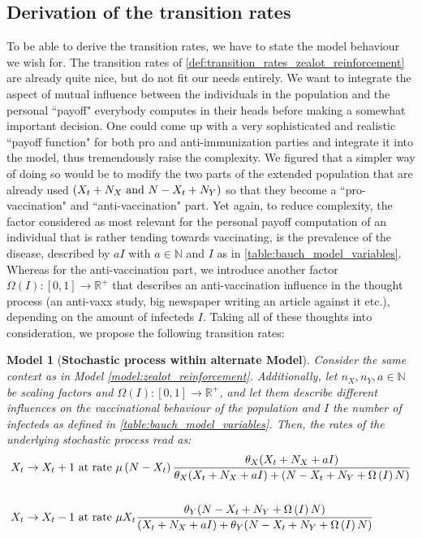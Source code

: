 \documentclass[12pt,a4paper,twoside]{article}
\newtheorem{model}{Model}[section]
\begin{document}
\subsection{Derivation of the transition rates}
To be able to derive the transition rates, we have to state the model behaviour we wish for. The transition rates of \eqref{def:transition_rates_zealot_reinforcement} are already quite nice, but do not fit our needs entirely. We want to integrate the aspect of mutual influence between the individuals in the population and the personal ``payoff" everybody computes in their heads before making a somewhat important decision. One could come up with a very sophisticated and realistic ``payoff function" for both pro and anti-immunization parties and integrate it into the model, thus tremendously raise the complexity. We figured that a simpler way of doing so would be to modify the two parts of the extended population that are already used $\left(X_t + N_X\textnormal{ and }N- X_t + N_Y\right)$ so that they become a ``pro-vaccination" and ``anti-vaccination" part. Yet again, to reduce complexity, the factor considered as most relevant for the personal payoff computation of an individual that is rather tending towards vaccinating, is the prevalence of the disease, described by $aI$ with $a \in \mathbb{N}$ and $I$ as in \eqref{table:bauch_model_variables}. Whereas for the anti-vaccination part, we introduce another factor $\Omega\left(I\right): \left[0,1\right]\rightarrow \mathbb{R^+}$ that describes an anti-vaccination influence in the thought process (an anti-vaxx study, big newspaper writing an article against it etc.), depending on the amount of infecteds $I$.
Taking all of these thoughts into consideration, we propose the following transition rates:
\begin{model}[\textbf{Stochastic process within alternate Model}]
	Consider the same context as in Model \ref{model:zealot_reinforcement}. Additionally, let $n_X, n_Y, a \in \mathbb{N}$ be scaling factors and $\Omega\left(I\right): \left[0,1\right] \rightarrow \mathbb{R^+}$, and let them describe different influences on the vaccinational behaviour of the population and $I$ the number of infecteds as defined in \eqref{table:bauch_model_variables}. Then, the rates of the underlying stochastic process read as:
\begin{align}\label{def:transition_rates_my_model}
\begin{split}
X_t \rightarrow X_t + 1 & \textnormal{ at rate } \mu\left(N-X_t\right)\frac{\theta_X (X_t + N_X + aI)}{\theta_X (X_t + N_X + aI) + (N-X_t + N_Y + \Omega\left(I\right) N)} \\
&\\
X_t \rightarrow X_t - 1 & \textnormal{ at rate } \mu X_t\frac{\theta_Y(N-X_t+N_Y + \Omega\left(I\right) N)}{(X_t + N_X+aI) + \theta_Y(N-X_t+N_Y + \Omega\left(I\right) N)}
\end{split}
\end{align}
\end{model}
\end{document}
